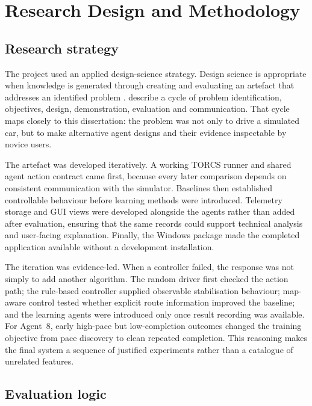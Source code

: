 \section{Research Design and Methodology}
\label{ch:methodology}

\subsection{Research strategy}

The project used an applied design-science strategy. Design science is appropriate when knowledge is generated through creating and evaluating an artefact that addresses an identified problem \parencite{hevner2004}. \textcite{peffers2007} describe a cycle of problem identification, objectives, design, demonstration, evaluation and communication. That cycle maps closely to this dissertation: the problem was not only to drive a simulated car, but to make alternative agent designs and their evidence inspectable by novice users.

The artefact was developed iteratively. A working TORCS runner and shared agent action contract came first, because every later comparison depends on consistent communication with the simulator. Baselines then established controllable behaviour before learning methods were introduced. Telemetry storage and GUI views were developed alongside the agents rather than added after evaluation, ensuring that the same records could support technical analysis and user-facing explanation. Finally, the Windows package made the completed application available without a development installation.

The iteration was evidence-led. When a controller failed, the response was not simply to add another algorithm. The random driver first checked the action path; the rule-based controller supplied observable stabilisation behaviour; map-aware control tested whether explicit route information improved the baseline; and the learning agents were introduced only once result recording was available. For Agent~8, early high-pace but low-completion outcomes changed the training objective from pace discovery to clean repeated completion. This reasoning makes the final system a sequence of justified experiments rather than a catalogue of unrelated features.

\subsection{Evaluation logic}

